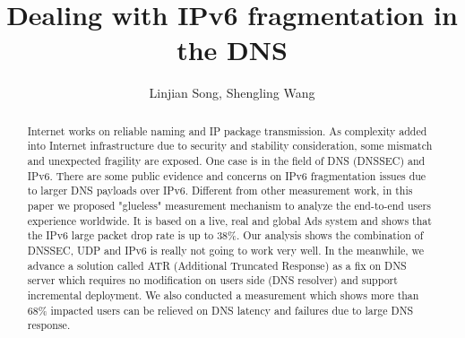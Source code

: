 \documentclass[sigconf]{acmart}
\begin{document}
\title{Dealing with IPv6 fragmentation in the DNS}


\author{Linjian Song, Shengling Wang}

\renewcommand{\shortauthors}{X.et al.}

\begin{abstract}
Internet works on reliable naming and IP package transmission.
As complexity added into Internet infrastructure due to security
and stability consideration, some mismatch and unexpected fragility
are exposed. One case is in the field of DNS (DNSSEC) and IPv6.
There are some public evidence and concerns on IPv6 fragmentation
issues due to larger DNS payloads over IPv6. Different from other
measurement work, in this paper we proposed "glueless" measurement
mechanism to analyze the end-to-end users experience worldwide.
It is based on a live, real and global Ads system and shows that
the IPv6 large packet drop rate is up to 38\%. Our analysis shows
the combination of DNSSEC, UDP and IPv6 is really not going to work
very well. In the meanwhile, we advance a solution called ATR
(Additional Truncated Response) as a fix on DNS server which
requires no modification on users side (DNS resolver) and support
incremental deployment. We also conducted a measurement which shows
more than 68\% impacted users can be relieved on DNS latency and
failures due to large DNS response.
\end{abstract}

\maketitle





\end{document}
